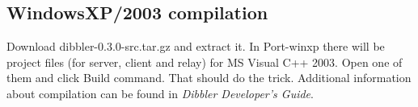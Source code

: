 \subsection{WindowsXP/2003 compilation}
Download dibbler-0.3.0-src.tar.gz and extract it. In Port-winxp there
will be project files (for server, client and relay) for MS
Visual C++ 2003. Open one of them and click Build command. That should
do the trick. Additional information about compilation can be found in
\emph{Dibbler Developer's Guide}.
